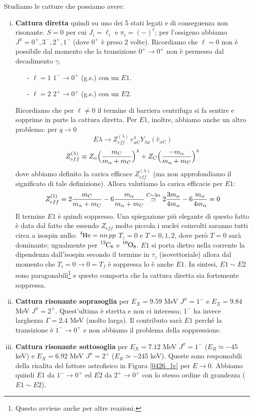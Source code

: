 \noindent Studiamo le catture che possiamo avere:
\begin{enumerate}[i.]
	\item \textbf{Cattura diretta} quindi su uno dei 5 stati legati e di conseguenza non risonante. $S=0$ per cui $J_i = \ell_i$ e $\pi_i = (-)^\ell$; per l'ossigeno abbiamo $J^\pi = 0^+,3^-,2^+,1^-$ (dove $0^+$ è preso 2 volte). Ricordiamo che $\ell=0$ non è possibile dal momento che la transizione $0^+\to0^+$ non è permessa dal decadimento $\gamma$.
	\begin{itemize}
		\item[-] $\ell =1$ $1^-\to0^+$ (g.s.) con un $E1$.
		\item[-] $\ell=2$ $2^+\to0^+$ (g.s.) con un $E2$. 
	\end{itemize}
	Ricordiamo che per $\ell\not = 0$ il termine di barriera centrifuga si fa sentire e sopprime in parte la cattura diretta. Per $E1$, inoltre, abbiamo anche un altro problema: per $q\to0$ 
	$$E\lambda \to Z_{eff}^{(\lambda)}\,r_{\alpha\mbox{C}}^\lambda Y_{\lambda \mu}(\hat{r}_{\alpha\mbox{C}})$$
	$$Z_{eff}^{(\lambda)} \equiv Z_\alpha \Bigl ( \frac{m_{C}}{m_\alpha + m_{C}} \Bigr )^\lambda + Z_C \Bigl ( \frac{-m_\alpha}{m_\alpha+m_C} \Bigr )^\lambda$$
	dove abbiamo definito la carica efficace $Z_{eff}^{(\lambda)}$ (ma non approfondiamo il significato di tale definizione). Allora valutiamo la carica efficacie per $E1$:
	$$Z_{eff}^{(1)} = 2{\frac{m_{C}}{m_\alpha + m_{C}}} - 6 {\frac{m_\alpha}{m_\alpha+m_C}} \stackrel{\ce{C}\sim 3\alpha}{\simeq} 2 \frac{3m_\alpha}{4m_\alpha} - 6 \frac{m_\alpha}{4m_\alpha} = 0$$
	Il termine $E1$ è quindi soppresso. Una spiegazione più elegante di questo fatto è data dal fatto che essendo $Z_{eff}$ molto piccola i nuclei coinvolti saranno tutti circa a isospin nullo: $\ce{^4He} = nn\, pp$ $T_z=0$ e $T=0,1,2$, dove però $T=0$ sarà dominante; ugualmente per $\ce{^12C_6}$ e $\ce{^{16}O_8}$. $E1$ si porta dietro nella corrente la dipendenza dall'isospin secondo il termine in $\tau_z$ (isovettoriale) allora dal momento che $T_i=0\to0=T_f$ è soppressa lo è anche $E1$. In sintesi, $E1\sim E2$ sono paragonabili\footnote{Questo avviene anche per altre reazioni.} %
	e questo comporta che la cattura diretta sia fortemente soppressa.
	\item \textbf{Cattura risonante soprasoglia} per $E_X = 9.59$ MeV $J^\pi = 1^-$ e $E_X = 9.84$ MeV $J^\pi = 2^+$. Quest'ultima è stretta e non ci interessa; $1^-$ ha invece larghezza $\Gamma=2.4$ MeV (molto larga). Il contributo sarà $E1$ perché la transizione è $1^-\to0^+$ e non abbiamo il problema della soppressione.
	\item \textbf{Cattura risonante sottosoglia} per $E_X = 7.12$ MeV $J^\pi =1^-$ ($E_R\simeq -45$ keV) e $E_X = 6.92$ MeV $J^\pi =2^+$ ($E_R\simeq -245$ keV). Queste sono responsabili della risalita del fattore astrofisico in Figura \ref{0426_lv} per $E\to0$. Abbiamo quindi $E1$ da $1^-\to0^+$ ed $E2$ da $2^+\to0^+$ con lo stesso ordine di grandezza ($E1\sim E2$).
\end{enumerate}

